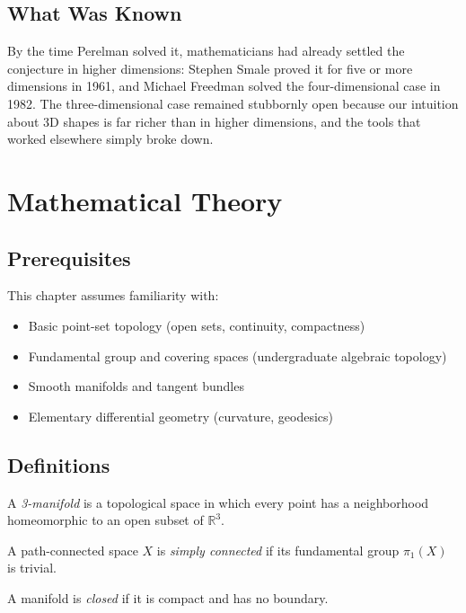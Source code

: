 \subsection{What Was Known}
By the time Perelman solved it, mathematicians had already settled the conjecture in higher dimensions: Stephen Smale proved it for five or more dimensions in 1961, and Michael Freedman solved the four-dimensional case in 1982. The three-dimensional case remained stubbornly open because our intuition about 3D shapes is far richer than in higher dimensions, and the tools that worked elsewhere simply broke down.

\section{Mathematical Theory}


\subsection{Prerequisites}
This chapter assumes familiarity with:
\begin{itemize}
\item Basic point-set topology (open sets, continuity, compactness)
\item Fundamental group and covering spaces (undergraduate algebraic topology)
\item Smooth manifolds and tangent bundles
\item Elementary differential geometry (curvature, geodesics)
\end{itemize}

\subsection{Definitions}

\begin{definition}[3-Manifold]
A \emph{3-manifold} is a topological space in which every point has a neighborhood homeomorphic to an open subset of $\mathbb{R}^3$.
\end{definition}

\begin{definition}
A path-connected space $X$ is \emph{simply connected} if its fundamental group $\pi_1(X)$ is trivial.
\end{definition}

\begin{definition}
A manifold is \emph{closed} if it is compact and has no boundary.
\end{definition}

